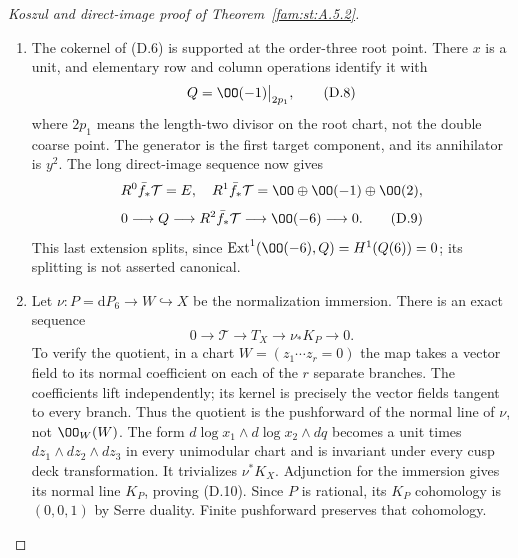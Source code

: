 \begin{proof}[Koszul and direct-image proof of Theorem~\ref{fam:st:A.5.2}]
\begin{enumerate}[label=\arabic*.,leftmargin=*]
\item The cokernel of (D.6) is supported at the order-three root point. There
$x$ is a unit, and elementary row and column operations identify it
with
\[
 Q=\OO(-1)\big|_{2p_1},                               \tag{D.8}
\]
where $2p_1$ means the length-two divisor on the root chart, not the
double coarse point. The generator is the first target component,
and its annihilator is $y^2$. The long direct-image sequence now gives
\[
 R^0\bar f_*\mathcal T=E,\quad
 R^1\bar f_*\mathcal T=\OO\oplus\OO(-1)\oplus\OO(2),
\]
\[
 0\longrightarrow Q\longrightarrow R^2\bar f_*\mathcal T
 \longrightarrow\OO(-6)\longrightarrow0.              \tag{D.9}
\]
This last extension splits, since $\operatorname{Ext}^1(\OO(-6),Q)
=H^1(Q(6))=0$; its splitting is not asserted canonical.

\item Let $\nu:P=\mathrm dP_6\to W\hookrightarrow X$ be the normalization
immersion. There is an exact sequence
\[
 0\longrightarrow\mathcal T\longrightarrow T_X
 \longrightarrow\nu_*K_P\longrightarrow0.             \tag{D.10}
\]
To verify the quotient, in a chart $W=(z_1\cdots z_r=0)$ the map takes
a vector field to its normal coefficient on each of the $r$ separate
branches. The coefficients lift independently; its kernel is precisely
the vector fields tangent to every branch. Thus the quotient is the
pushforward of the normal line of $\nu$, not $\OO_W(W)$.
The form $d\log x_1\wedge d\log x_2\wedge dq$ becomes a unit times
$dz_1\wedge dz_2\wedge dz_3$ in every unimodular chart and is invariant
under every cusp deck transformation. It trivializes $\nu^*K_X$.
Adjunction for the immersion gives its normal line $K_P$, proving
(D.10). Since $P$ is rational, its $K_P$ cohomology is $(0,0,1)$ by
Serre duality. Finite pushforward preserves that cohomology.


\end{enumerate}
\end{proof}
